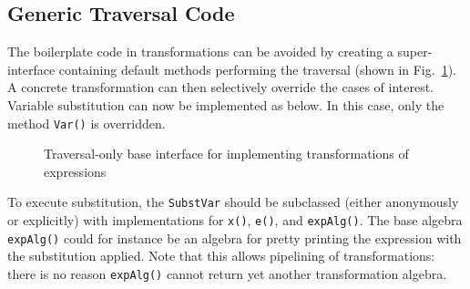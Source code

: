 \subsection{Generic Traversal Code}

The boilerplate code in transformations can be avoided by creating a
super-interface containing default methods performing the traversal
(shown in Fig.~\ref{generic_transform}). A concrete transformation can
then selectively override the cases of interest. Variable substitution
can now be implemented as below. In
this case, only the method \lstinline{Var()} is overridden.


\begin{figure}[t]
\nocaptionrule
\caption{Traversal-only base interface for implementing transformations of expressions}
\label{generic_transform}
\end{figure}

To execute substitution, the \lstinline{SubstVar} should be subclassed
(either anonymously or explicitly) with implementations for
\lstinline{x()}, \lstinline{e()}, and \lstinline{expAlg()}. The base
algebra \lstinline{expAlg()} could for instance be an algebra for
pretty printing the expression with the substitution applied. Note
that this allows pipelining of transformations: there is no reason
\lstinline{expAlg()} cannot return yet another transformation
algebra.

\begin{comment}
\haoyuan{Begin: client code.}

Here we also give the client code. With the same expression \lstinline{x + (y + 2)}, a \lstinline{SubstVar} object is created. The base algebra \lstinline{expAlg()} here is implemented with an instance of \lstinline{FreeVars}, and we also override \lstinline{x()} and \lstinline{e()} aiming to substitute another variable \lstinline{"z"} for \lstinline{"x"}. The code is as follows, where the result of execution becomes \lstinline{[y, z]}.


\haoyuan{End: client code.}
\end{comment}


